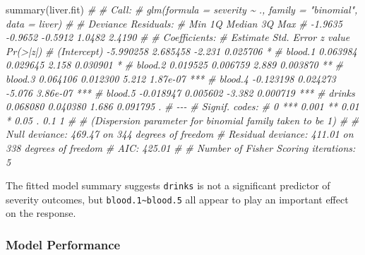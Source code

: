 \documentclass[
  11pt,
  a4paper,
]{scrartcl}
\newenvironment{Shaded}{\begin{snugshade}}{\end{snugshade}}
\newcommand{\CommentTok}[1]{\textcolor[rgb]{0.56,0.35,0.01}{\textit{#1}}}
\newcommand{\FunctionTok}[1]{\textcolor[rgb]{0.00,0.00,0.00}{#1}}
\newcommand{\NormalTok}[1]{#1}
\begin{document}
\begin{Shaded}
\begin{Highlighting}[]
\FunctionTok{summary}\NormalTok{(liver.fit)}
\CommentTok{\# }
\CommentTok{\# Call:}
\CommentTok{\# glm(formula = severity \textasciitilde{} ., family = "binomial", data = liver)}
\CommentTok{\# }
\CommentTok{\# Deviance Residuals: }
\CommentTok{\#     Min       1Q   Median       3Q      Max  }
\CommentTok{\# {-}1.9635  {-}0.9652  {-}0.5912   1.0482   2.4190  }
\CommentTok{\# }
\CommentTok{\# Coefficients:}
\CommentTok{\#              Estimate Std. Error z value Pr(\textgreater{}|z|)    }
\CommentTok{\# (Intercept) {-}5.990258   2.685458  {-}2.231 0.025706 *  }
\CommentTok{\# blood.1      0.063984   0.029645   2.158 0.030901 *  }
\CommentTok{\# blood.2      0.019525   0.006759   2.889 0.003870 ** }
\CommentTok{\# blood.3      0.064106   0.012300   5.212 1.87e{-}07 ***}
\CommentTok{\# blood.4     {-}0.123198   0.024273  {-}5.076 3.86e{-}07 ***}
\CommentTok{\# blood.5     {-}0.018947   0.005602  {-}3.382 0.000719 ***}
\CommentTok{\# drinks       0.068080   0.040380   1.686 0.091795 .  }
\CommentTok{\# {-}{-}{-}}
\CommentTok{\# Signif. codes:  }
\CommentTok{\# 0 \textquotesingle{}***\textquotesingle{} 0.001 \textquotesingle{}**\textquotesingle{} 0.01 \textquotesingle{}*\textquotesingle{} 0.05 \textquotesingle{}.\textquotesingle{} 0.1 \textquotesingle{} \textquotesingle{} 1}
\CommentTok{\# }
\CommentTok{\# (Dispersion parameter for binomial family taken to be 1)}
\CommentTok{\# }
\CommentTok{\#     Null deviance: 469.47  on 344  degrees of freedom}
\CommentTok{\# Residual deviance: 411.01  on 338  degrees of freedom}
\CommentTok{\# AIC: 425.01}
\CommentTok{\# }
\CommentTok{\# Number of Fisher Scoring iterations: 5}
\end{Highlighting}
\end{Shaded}

The fitted model summary suggests \texttt{drinks} is not a significant
predictor of severity outcomes, but
\texttt{blood.1\textasciitilde{}blood.5} all appear to play an important
effect on the response.

\hypertarget{model-performance}{%
\subsubsection{Model Performance}\label{model-performance}}
\end{document}
